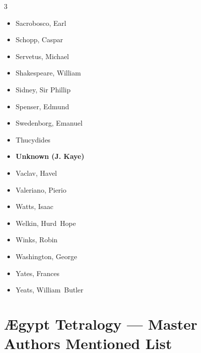 \documentclass[10pt,makeidx]{extreport}
\begin{document}
\begin{multicols}{3}
\begin{itemize}
		\item Sacrobosco, Earl
		\item Schopp, Caspar
		\item Servetus, Michael
		\item Shakespeare, William
		\item Sidney, Sir Phillip
		\item Spenser, Edmund
		\item Swedenborg, Emanuel
		\item Thucydides
		\item \textbf{Unknown (J. Kaye)}
		\item Vaclav, Havel
		\item Valeriano, Pierio
		\item Watts, Isaac
		\item Welkin, Hurd~Hope
		\item Winks, Robin
		\item Washington, George
		\item Yates, Frances
		\item Yeats, William~Butler
	\end{itemize}
\end{multicols}

\pagebreak
\section{Ægypt Tetralogy — Master Authors Mentioned List}
\end{document}
